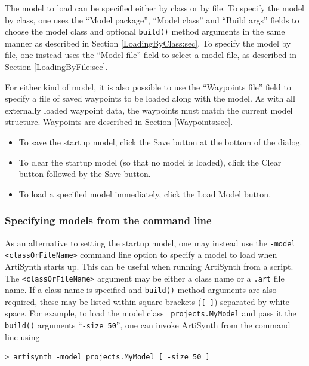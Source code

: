 \documentclass{article}
\begin{document}
The model to load can be specified either by class or by file. To
specify the model by class, one uses the {\sf ``Model package''},
{\sf ``Model class''} and {\sf ``Build args''} fields to choose the
model class and optional {\tt build()} method arguments in
the same manner as described in Section \ref{LoadingByClass:sec}. To
specify the model by file, one instead uses the {\sf ``Model file''}
field to select a model file, as described in Section
\ref{LoadingByFile:sec}.

For either kind of model, it is also possible to use the {\sf
``Waypoints file''} field to specify a file of saved waypoints to be
loaded along with the model. As with all externally loaded waypoint
data, the waypoints must match the current model structure.
Waypoints are described in Section \ref{Waypoints:sec}.

\begin{itemize}

\item To save the startup model, click the {\sf Save} button at the
bottom of the dialog.

\item To clear the startup model (so that no model is loaded), click
the {\sf Clear} button followed by the {\sf Save} button.

\item To load a specified model immediately, click the {\sf Load
Model} button.

\end{itemize}

\subsubsection{Specifying models from the command line}

As an alternative to setting the startup model, one may instead use
the {\tt -model <classOrFileName>} command line option to specify a
model to load when ArtiSynth starts up. This can be useful when
running ArtiSynth from a script.  The {\tt <classOrFileName>} argument
may be either a class name or a {\tt .art} file name. If a class name
is specified and {\tt build()} method arguments are also required,
these may be listed within square brackets ({\tt [ ]}) separated by
white space. For example, to load the model class {\tt
projects.MyModel} and pass it the {\tt build()} arguments ``{\tt -size
50}'', one can invoke ArtiSynth from the command line using
%
\begin{verbatim}
> artisynth -model projects.MyModel [ -size 50 ]
\end{verbatim}
%
\end{document}
